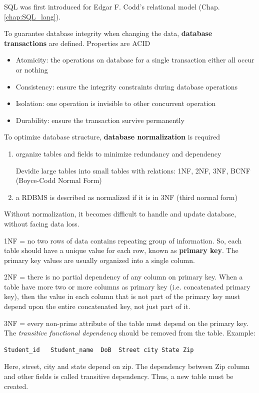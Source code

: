 SQL was first introduced for Edgar F. Codd's relational model
(Chap.\ref{chap:SQL_lang}).

To guarantee database integrity when changing the data, {\bf database
transactions} are defined. Properties are ACID
\begin{itemize}
  \item Atomicity: the operations on database for a single transaction either
  all occur or nothing
  
  \item Consistency: ensure the integrity constraints during database operations
  \item Isolation: one operation is invisible to other concurrent operation
  \item Durability: ensure the transaction survive permanently
\end{itemize}


To optimize database structure, {\bf database normalization} is required
\begin{enumerate}
  \item organize tables and fields to minimize redundancy and dependency
  
  Devidie large tables into small tables with relations: 1NF, 2NF, 3NF, BCNF
  (Boyce-Codd Normal Form)
  
  \item a RDBMS is described as normalized if it is in 3NF (third normal form)
\end{enumerate}
Without normalization, it becomes difficult to handle and update database,
without facing data loss.

1NF = no two rows of data contains repeating group of information. So, each
table should have a unique value for each row, known as {\bf primary key}. The
primary key values are usually organized into a single column.

2NF = there is no partial dependency of any column on primary key. When a table
have more two or more columns as primary key (i.e. concatenated primary key),
then the value in each column that is not part of the primary key must depend
upon the entire concatenated key, not just part of it.

3NF = every non-prime attribute of the table must depend on the primary key. The
{\it transitive functional dependency} should be removed from the table.
Example:
\begin{verbatim}
Student_id   Student_name  DoB  Street city State Zip
\end{verbatim}
Here, street, city and state depend on zip. The dependency between Zip column
and other fields is called transitive dependency. Thus, a new table must be
created.

